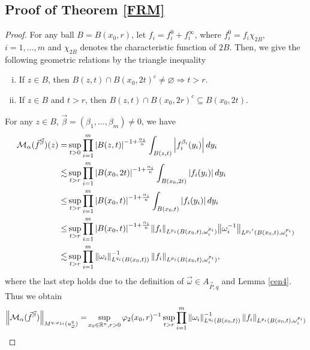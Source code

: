 \documentclass[11pt, twoside, leqno]{article}
\begin{document}
\subsection{Proof of Theorem \ref{FRM}}
\begin{proof}[Proof]
	For any ball $B=B(x_0,r)$, let $f_i=f^0_i+f^{\infty}_i$, where $f^0_i=f_i\chi_{2B}$, $i=1,\ldots,m$ and $\chi_{2B}$ denotes the characteristic function of $2B$. Then, we give the following geometric relations by the triangle inequality
	\begin{enumerate}[(i)]
		\item If $z\in B$, then $B(z,t) \cap B{({x_0},2t)^c} \ne \varnothing  \Rightarrow t > r$.
		\item If $z\in B$ and $t > r$, then $B(z,t) \cap B{({x_0},2r)^c} \subseteq B({x_0},2t)$.
	\end{enumerate}
	For any $z\in B$, $\vec \beta  = \left( {{\beta _1}, \ldots ,{\beta _m}} \right) \ne 0$, we have 
	\begin{align}
	{\mathcal{M}_\alpha }({{\vec f}^{\vec \beta }})(z)=& \mathop {\sup }\limits_{t > 0} \prod\limits_{i = 1}^m {{{\left| {B(z,t)} \right|}^{ - 1 + \frac{\alpha_1 }{{n}}}}\int_{B(z,t)} {\left| {f_i^{{\beta _i}}({y_i})} \right|d{y_i}} }\notag\\
	\lesssim& \mathop {\sup }\limits_{t > r} \prod\limits_{i = 1}^m {{{\left| {B({x_0},2t)} \right|}^{ - 1 + \frac{\alpha_i }{{n}}}}\int_{B({x_0},2t)} {\left| {{f_i}({y_i})} \right|d{y_i}} } \notag\\
	\le& \mathop {\sup }\limits_{t > r} \prod\limits_{i = 1}^m {{{\left| {B({x_0},t)} \right|}^{ - 1 + \frac{\alpha_i }{{n}}}}\int_{B({x_0},t)} {\left| {{f_i}({y_i})} \right|d{y_i}} } \notag\\
	\le& \mathop {\sup }\limits_{t > r} \prod\limits_{i = 1}^m {{{\left| {B({x_0},t)} \right|}^{ - 1 + \frac{\alpha_i }{{n}}}}{{\left\| {{f_i}} \right\|}_{{L^{{p_i}}}(B({x_0},t),\omega _i^{{p_i}})}}{{\left\| {\omega _i^{ - 1}} \right\|}_{{L^{{p_i}^\prime }}(B({x_0},t),\omega _i^{{p_i}})}}}\notag\\
	\lesssim&\mathop {\sup }\limits_{t > r} \prod\limits_{i = 1}^m {\left\| {{\omega _i}} \right\|_{{L^{{q_i}}}(B({x_0},t))}^{ - 1}{{\left\| {{f_i}} \right\|}_{{L^{{p_i}}}(B({x_0},t),\omega _i^{{p_i}})}}},\notag
	\end{align}
	where the last step holds due to the definition of $\vec{\omega} \in {A_{\vec P,q}}$ and Lemma \ref{cen4}. Thus we obtain 
	\begin{align}\label{ieq1}
	{\left\| {{\mathcal{M}_\alpha }({{\vec f}^{\vec \beta }})} \right\|_{{M^{q,{\varphi _{1i}}}}(u_{\vec \omega }^q)}} =& \mathop {\sup }\limits_{{x_0} \in \rn,r > 0} {\varphi _2}{({x_0},r)^{ - 1}}\mathop {\sup }\limits_{t > r} \prod\limits_{i = 1}^m {\left\| {{\omega _i}} \right\|_{{L^{{q_i}}}(B({x_0},t))}^{ - 1}{{\left\| {{f_i}} \right\|}_{{L^{{p_i}}}(B({x_0},t),\omega _i^{{p_i}})}}}\notag\\

\end{align}
\end{proof}
\end{document}
